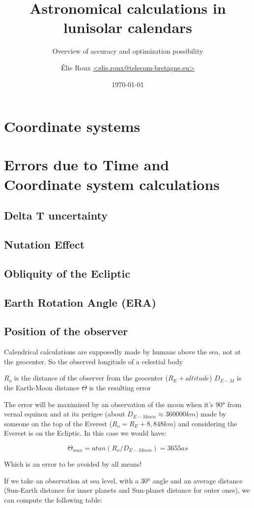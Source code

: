 \documentclass[%
a4paper,%
pagesize,%
12pt,%
parskip=off,%
bibliography=totoc,%
numbers=noenddot,%
DIV=12,%
twoside=semi,%
headings=small,%
]{scrbook}
\title{Astronomical calculations in lunisolar calendars}
\subtitle{Overview of accuracy and optimization possibility}
\author{Élie Roux \href{mailto:elie.roux@telecom-bretagne.eu}{<elie.roux@telecom-bretagne.eu>}}
\date{\today}
\let\mychapter\chapter
\let\mysection\section
\begin{document}
\maketitle

\tableofcontents
\newpage











\mychapter{Coordinate systems}

\mychapter{Errors due to Time and Coordinate system calculations}

\mysection{Delta T uncertainty}

\mysection{Nutation Effect}

\mysection{Obliquity of the Ecliptic}

\mysection{Earth Rotation Angle (ERA)}

\mysection{Position of the observer}

Calendrical calculations are supposedly made by humans above the sea, not at the geocenter. So the observed longitude of a celestial body 

$R_o$ is the distance of the observer from the geocenter ($R_E+altitude$)
$D_{E-M}$ is the Earth-Moon distance
$\Theta$ is the resulting error

The error will be maximized by an observation of the moon when it's $90°$ from vernal equinox and at its perigee (about $D_{E-Mmin}\approx360000km$) made by someone on the top of the Everest ($R_o=R_E+8,848km$) and considering the Everest is on the Ecliptic. In this case we would have:

$$\Theta_{max} = atan(R_o/D_{E-Mmin}) = 3655as$$


Which is an error to be avoided by all means!

If we take an observation at sea level, with a $30°$ angle and an average distance (Sun-Earth distance for inner planets and Sun-planet distance for outer ones), we can compute the following table:
\end{document}
